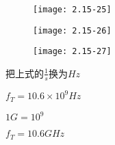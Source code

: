 \begin{figure}[H] %
	\begin{minipage}{\linewidth}
		\texttt{[image: 2.15-25]}
	\end{minipage}
\end{figure}

\begin{figure}[H] %
	\begin{minipage}{\linewidth}
		\texttt{[image: 2.15-26]}
	\end{minipage}
\end{figure}

\begin{figure}[H] %
	\begin{minipage}{\linewidth}
		\texttt{[image: 2.15-27]}
	\end{minipage}
\end{figure}


把上式的$\frac{1}{s}$换为$Hz$

$f_T=10.6 \times 10^9Hz$

$1G=10^9$

$f_T=10.6GHz$













\color{black}{}